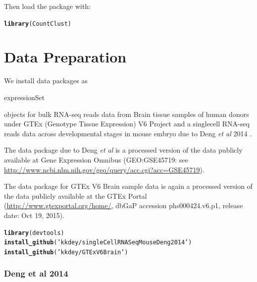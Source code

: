 \documentclass[12pt]{article}\usepackage[]{graphicx}\usepackage[usenames,dvipsnames]{color}
\makeatletter
\newcommand{\hlstr}[1]{\textcolor[rgb]{0.192,0.494,0.8}{#1}}%
\newcommand{\hlstd}[1]{\textcolor[rgb]{0.345,0.345,0.345}{#1}}%
\newcommand{\hlkwd}[1]{\textcolor[rgb]{0.737,0.353,0.396}{\textbf{#1}}}%
\newenvironment{kframe}{%
 \def\at@end@of@kframe{}%
 \ifinner\ifhmode%
  \def\at@end@of@kframe{\end{minipage}}%
  \begin{minipage}{\columnwidth}%
 \fi\fi%
 \def\FrameCommand##1{\hskip\@totalleftmargin \hskip-\fboxsep
 \colorbox{shadecolor}{##1}\hskip-\fboxsep
     \hskip-\linewidth \hskip-\@totalleftmargin \hskip\columnwidth}%
 \MakeFramed {\advance\hsize-\width
   \@totalleftmargin\z@ \linewidth\hsize
   \@setminipage}}%
 {\par\unskip\endMakeFramed%
 \at@end@of@kframe}
\newenvironment{knitrout}{}{} %
\makeatother
\begin{document}
Then load the package with:

\begin{knitrout}
\color{fgcolor}\begin{kframe}
\begin{alltt}
\hlkwd{library}\hlstd{(CountClust)}
\end{alltt}
\end{kframe}
\end{knitrout}

\section{Data Preparation}

We install data packages as \begin{verb} expressionSet \end{verb} objects for bulk RNA-seq reads data from Brain tissue samples of human donors under GTEx (Genotype Tissue Expression) V6 Project  \cite{GTEX2013} and a singlecell RNA-seq reads data across developmental stages in mouse embryo due to Deng \textit{et al} 2014 \cite{Deng2014}.

The data package due to Deng \textit{et al} is a processed version of the data publicly available at Gene Expression Omnibus (GEO:GSE45719: see \url{http://www.ncbi.nlm.nih.gov/geo/query/acc.cgi?acc=GSE45719}).

The data package for GTEx V6 Brain sample data is again a processed version of the data publicly available at the GTEx Portal (\url{http://www.gtexportal.org/home/}, dbGaP accession phs000424.v6.p1, release date: Oct 19, 2015).


\begin{knitrout}
\color{fgcolor}\begin{kframe}
\begin{alltt}
\hlkwd{library}\hlstd{(devtools)}
\hlkwd{install_github}\hlstd{(}\hlstr{'kkdey/singleCellRNASeqMouseDeng2014'}\hlstd{)}
\hlkwd{install_github}\hlstd{(}\hlstr{'kkdey/GTExV6Brain'}\hlstd{)}
\end{alltt}
\end{kframe}
\end{knitrout}

\subsubsection{Deng et al 2014}
\end{document}
